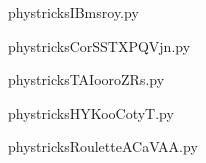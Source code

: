     

    \clearpage
    


    \newcommand{\CaptionFigIBmsroy}{<+Type your caption here+>}
    \begin{center}
        
    \end{center}
    phystricksIBmsroy.py

    

    \clearpage
    


    \newcommand{\CaptionFigCorSSTXPQVjn}{<+Type your caption here+>}
    \begin{center}
        
    \end{center}
    phystricksCorSSTXPQVjn.py

    

    \clearpage
    


    \newcommand{\CaptionFigTAIooroZRs}{<+Type your caption here+>}
    \begin{center}
        
    \end{center}
    phystricksTAIooroZRs.py

    

    \clearpage
    


    \newcommand{\CaptionFigHYKooCotyT}{<+Type your caption here+>}
    \begin{center}
        
    \end{center}
    phystricksHYKooCotyT.py

    

    \clearpage
    


    \newcommand{\CaptionFigRouletteACaVAA}{<+Type your caption here+>}
    \begin{center}
        
    \end{center}
    phystricksRouletteACaVAA.py

    

    \clearpage
    


